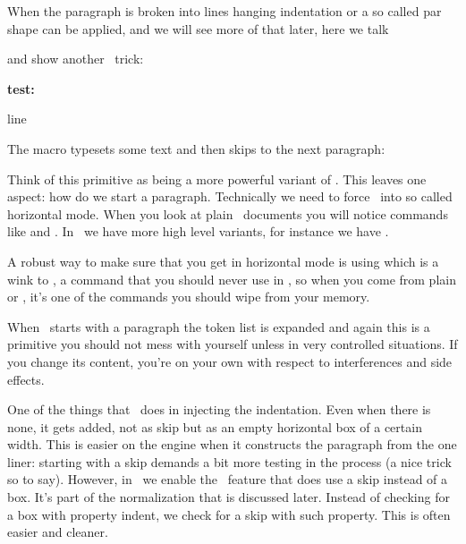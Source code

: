 When the paragraph is broken into lines hanging indentation or a so called par
shape can be applied, and we will see more of that later, here we talk \type
{\par} and show another \LUAMETATEX\ trick:

\startbuffer
\def\foo{{\bf test:} \ignorepars}

\foo

line
\stopbuffer

\typebuffer[option=TEX]

The macro typesets some text and then skips to the next paragraph:

\start \getbuffer \stop

Think of this primitive as being a more powerful variant of \type
{\ignorespaces}. This leaves one aspect: how do we start a paragraph. Technically
we need to force \TEX\ into so called horizontal mode. When you look at plain
\TEX\ documents you will notice commands like \type {\noindent} and \type
{\indent}. In \CONTEXT\ we have more high level variants, for instance we have
\type {\noindentation}.

A robust way to make sure that you get in horizontal mode is using \type
{\dontleavehmode} which is a wink to \type {\leavevmode}, a command that you
should never use in \CONTEXT, so when you come from plain or \LATEX, it's one of
the commands you should wipe from your memory.

When \TEX\ starts with a paragraph the \type {\everypar} token list is expanded
and again this is a primitive you should not mess with yourself unless in very
controlled situations. If you change its content, you're on your own with respect
to interferences and side effects.

One of the things that \TEX\ does in injecting the indentation. Even when there
is none, it gets added, not as skip but as an empty horizontal box of a certain
width. This is easier on the engine when it constructs the paragraph from the one
liner: starting with a skip demands a bit more testing in the process (a nice
trick so to say). However, in \CONTEXT\ we enable the \LUAMETATEX\ feature that
does use a skip instead of a box. It's part of the normalization that is
discussed later. Instead of checking for a box with property indent, we check for
a skip with such property. This is often easier and cleaner.

